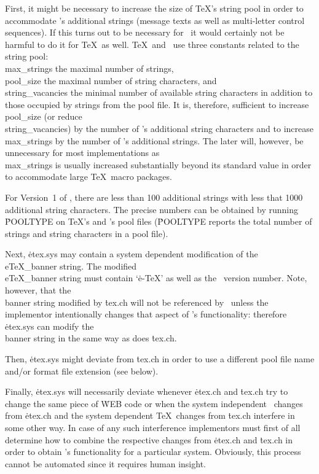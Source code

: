 First, it might be necessary to increase the size of \TeX's string pool
in order to accommodate \eTeX's additional strings (message texts as
well as multi-letter control sequences).  If this turns out to be
necessary for \eTeX\ it would certainly not be harmful to do it for
\TeX\ as well.  \TeX\ and \eTeX\ use three constants related to the
string pool:  \\{max\_strings} the maximal number of strings,
\\{pool\_size} the maximal number of string characters, and
\\{string\_vacancies} the minimal number of available string characters
in addition to those occupied by strings from the pool file.  It is,
therefore, sufficient to increase \\{pool\_size} (or reduce
\\{string\_vacancies}) by the number of \eTeX's additional string
characters and to increase \\{max\_strings} by the number of \eTeX's
additional strings.  The later will, however, be unnecessary for most
implementations as \\{max\_strings} is usually increased substantially
beyond its standard value in order to accommodate large \TeX\ macro
packages.

For Version~1 of \eTeX, there are less than 100 additional strings with
less that 1000 additional string characters.  The precise numbers can be
obtained by running \.{POOLTYPE} on \TeX's and \eTeX's pool files
(\.{POOLTYPE} reports the total number of strings and string characters
in a pool file).

Next, \.{etex.sys} may contain a system dependent modification of the
\\{eTeX\_banner} string.  The modified \\{eTeX\_banner} string must
contain `\.{e-TeX}' as well as the \eTeX\ version number.  Note,
however, that the \\{banner} string modified by \.{tex.ch} will not be
referenced by \eTeX\ unless the implementor intentionally changes that
aspect of \eTeX's functionality:  therefore \.{etex.sys} can modify the
\\{banner} string in the same way as does \.{tex.ch}.

Then, \.{etex.sys} might deviate from \.{tex.ch} in order to use a
different pool file name and\slash or format file extension (see below).

Finally, \.{etex.sys} will necessarily deviate whenever \.{etex.ch}
and \.{tex.ch} try to change the same piece of \.{WEB} code or when the
system independent \eTeX\ changes from \.{etex.ch} and the system
dependent \TeX\ changes from \.{tex.ch} interfere in some other way.  In
case of any such interference implementors must first of all determine
how to combine the respective changes from \.{etex.ch} and \.{tex.ch}
in order to obtain \eTeX's functionality for a particular system.
Obviously, this process cannot be automated since it requires human
insight.

